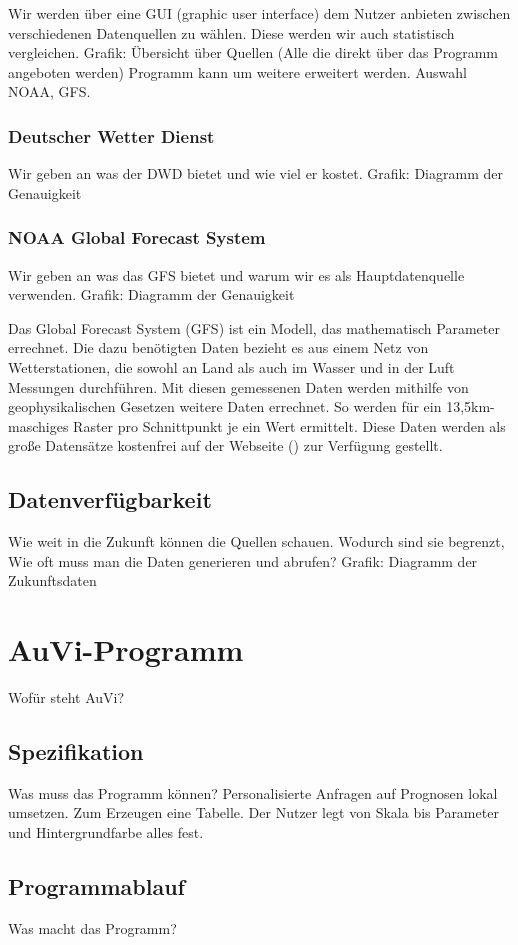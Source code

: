 \documentclass[a4paper,oneside,10pt,titlepage]{article}
\begin{document}
Wir werden über eine GUI (graphic user interface) dem Nutzer anbieten zwischen verschiedenen Datenquellen zu wählen. Diese werden wir auch statistisch vergleichen.
Grafik: Übersicht über Quellen (Alle die direkt über das Programm angeboten werden)
Programm kann um weitere erweitert werden.
Auswahl NOAA, GFS. 
\subsubsection{Deutscher Wetter Dienst}
Wir geben an was der DWD bietet und wie viel er kostet.
Grafik: Diagramm der Genauigkeit
\subsubsection{NOAA Global Forecast System}
Wir geben an was das GFS bietet und warum wir es als Hauptdatenquelle verwenden.
Grafik: Diagramm der Genauigkeit

Das Global Forecast System (GFS) ist ein Modell, das mathematisch Parameter errechnet. Die dazu benötigten Daten bezieht es aus einem Netz von Wetterstationen, die sowohl an Land als auch im Wasser und in der Luft Messungen durchführen. Mit diesen gemessenen Daten werden mithilfe von geophysikalischen Gesetzen weitere Daten errechnet. So werden für ein 13,5km-maschiges Raster pro Schnittpunkt je ein Wert ermittelt. Diese Daten werden als große Datensätze kostenfrei auf der Webseite ()  zur Verfügung gestellt.
\subsection{Datenverfügbarkeit}
Wie weit in die Zukunft können die Quellen schauen. Wodurch sind sie begrenzt, Wie oft muss man die Daten generieren und abrufen?
Grafik: Diagramm der Zukunftsdaten
\section{AuVi-Programm}
Wofür steht AuVi?
\subsection{Spezifikation}
Was muss das Programm können?
Personalisierte Anfragen auf Prognosen lokal umsetzen. Zum Erzeugen eine Tabelle. Der Nutzer legt von Skala bis Parameter und Hintergrundfarbe alles fest.
\subsection{Programmablauf}
Was macht das Programm?
\end{document}
